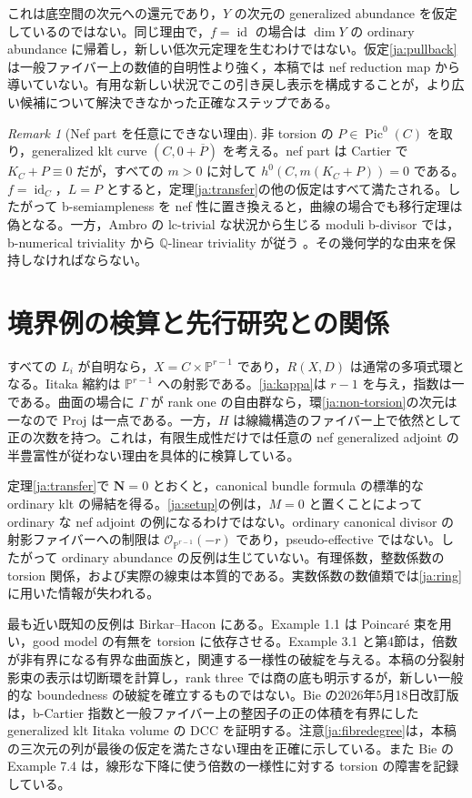 \documentclass[12pt]{amsart}
\theoremstyle{definition}
\theoremstyle{remark}
\newtheorem{rem}[thm]{Remark}
\numberwithin{equation}{section}
\newcommand{\cO}{\mathcal{O}}
\DeclareMathOperator{\id}{id}
\newcommand{\Q}{\mathbb{Q}}
\newcommand{\mP}{\mathbb{P}}
\DeclareMathOperator{\Pic}{Pic}
\newcommand{\bN}{\mathbf N}
\begin{document}
これは底空間の次元への還元であり，$Y$ の次元の generalized abundance を仮定しているのではない。同じ理由で，$f=\id$ の場合は $\dim Y$ の ordinary abundance に帰着し，新しい低次元定理を生むわけではない。仮定\eqref{ja:pullback}は一般ファイバー上の数値的自明性より強く，本稿では nef reduction map から導いていない。有用な新しい状況でこの引き戻し表示を構成することが，より広い候補について解決できなかった正確なステップである。

\begin{rem}[Nef part を任意にできない理由]\label{ja:badreplace}
非 torsion の $P\in\Pic^0(C)$ を取り，generalized klt curve $(C,0+\overline P)$ を考える。nef part は Cartier で $K_C+P\equiv0$ だが，すべての $m>0$ に対して $h^0(C,m(K_C+P))=0$ である。$f=\id_C$，$L=P$ とすると，定理\ref{ja:transfer}の他の仮定はすべて満たされる。したがって b-semiampleness を nef 性に置き換えると，曲線の場合でも移行定理は偽となる。一方，Ambro の lc-trivial な状況から生じる moduli b-divisor では，b-numerical triviality から $\Q$-linear triviality が従う \cite[Theorem 3.5]{ja-Amb}。その幾何学的な由来を保持しなければならない。
\end{rem}

\section{境界例の検算と先行研究との関係}\label{ja:checks}
すべての $L_i$ が自明なら，$X=C\times\mP^{r-1}$ であり，$R(X,D)$ は通常の多項式環となる。Iitaka 縮約は $\mP^{r-1}$ への射影である。\eqref{ja:kappa}は $r-1$ を与え，指数は一である。曲面の場合に $\Gamma$ が rank one の自由群なら，環\eqref{ja:non-torsion}の次元は一なので Proj は一点である。一方，$H$ は線織構造のファイバー上で依然として正の次数を持つ。これは，有限生成性だけでは任意の nef generalized adjoint の半豊富性が従わない理由を具体的に検算している。

定理\ref{ja:transfer}で $\bN=0$ とおくと，canonical bundle formula の標準的な ordinary klt の帰結を得る。\eqref{ja:setup}の例は，$M=0$ と置くことによって ordinary な nef adjoint の例になるわけではない。ordinary canonical divisor の射影ファイバーへの制限は $\cO_{\mP^{r-1}}(-r)$ であり，pseudo-effective ではない。したがって ordinary abundance の反例は生じていない。有理係数，整数係数の torsion 関係，および実際の線束は本質的である。実数係数の数値類では\eqref{ja:ring}に用いた情報が失われる。

最も近い既知の反例は Birkar--Hacon \cite{ja-BH} にある。Example 1.1 は Poincar\'e 束を用い，good model の有無を torsion に依存させる。Example 3.1 と第4節は，倍数が非有界になる有界な曲面族と，関連する一様性の破綻を与える。本稿の分裂射影束の表示は切断環を計算し，rank three では商の底も明示するが，新しい一般的な boundedness の破綻を確立するものではない。Bie の2026年5月18日改訂版 \cite[Theorem 1.7]{ja-Bie} は，b-Cartier 指数と一般ファイバー上の整因子の正の体積を有界にした generalized klt Iitaka volume の DCC を証明する。注意\ref{ja:fibredegree}は，本稿の三次元の列が最後の仮定を満たさない理由を正確に示している。また Bie の Example 7.4 は，線形な下降に使う倍数の一様性に対する torsion の障害を記録している。
\end{document}
